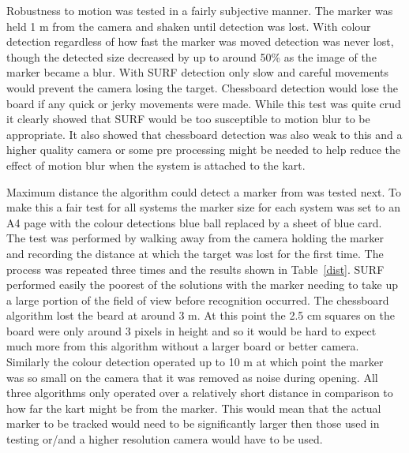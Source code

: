 Robustness to motion was tested in a fairly subjective manner. The marker was held 1 m from the camera and shaken until detection was lost. With colour detection regardless of how fast the marker was moved detection was never lost, though the detected size decreased by up to around 50\% as the image of the marker became a blur. With SURF detection only slow and careful movements would prevent the camera losing the target. Chessboard detection would lose the board if any quick or jerky movements were made. While this test was quite crud it clearly showed that SURF would be too susceptible to motion blur to be appropriate. It also showed that chessboard detection was also weak to this and a higher quality camera or some pre processing might be needed to help reduce the effect of motion blur when the system is attached to the kart.

Maximum distance the algorithm could detect a marker from was tested next. To make this a fair test for all systems the marker size for each system was set to an A4 page with the colour detections blue ball replaced by a sheet of blue card. The test was performed by walking away from the camera holding the marker and recording the distance at which the target was lost for the first time. The process was repeated three times and the results shown in Table~\ref{dist}. SURF performed easily the poorest of the solutions with the marker needing to take up a large portion of the field of view before recognition occurred. The chessboard algorithm lost the beard at around 3 m. At this point the 2.5 cm squares on the board were only around 3 pixels in height and so it would be hard to expect much more from this algorithm without a larger board or better camera. Similarly the colour detection operated up to 10 m at which point the marker was so small on the camera that it was removed as noise during opening. All three algorithms only operated over a relatively short distance in comparison to how far the kart might be from the marker. This would mean that the actual marker to be tracked would need to be significantly larger then those used in testing or/and a higher resolution camera would have to be used.

